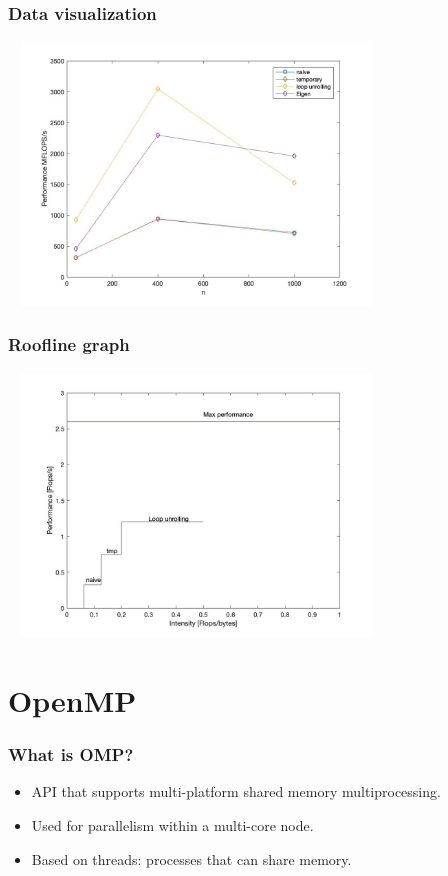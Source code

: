 \documentclass{beamer}
\begin{document}
\begin{frame}
\frametitle{Data visualization}
\includegraphics[width=10cm, height=7cm]{plotcolor}
\end{frame}

\begin{frame}
\frametitle{Roofline graph}
\includegraphics[width=10cm, height=7cm]{fig_ok}
\end{frame}


\section{OpenMP}

\begin{frame}
\frametitle{What is OMP?}
\begin{itemize}
\item <1-> API that supports multi-platform shared memory multiprocessing.
\item <2-> Used for parallelism within a multi-core node.
\item <3-> Based on threads: processes that can share memory.
\end{itemize}
\end{frame}
\end{document}
